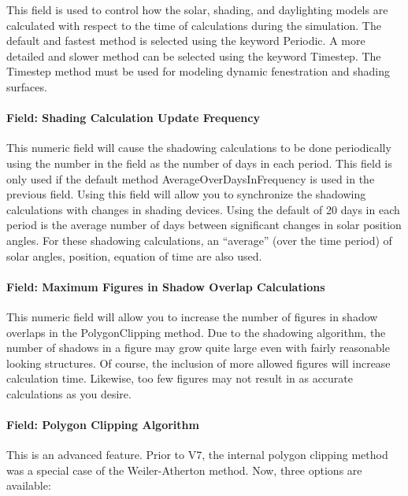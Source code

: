 This field is used to control how the solar, shading, and daylighting models are calculated with respect to the time of calculations during the simulation. The default and fastest method is selected using the keyword Periodic. A more detailed and slower method can be selected using the keyword Timestep. The Timestep method must be used for modeling dynamic fenestration and shading surfaces.

\paragraph{Field: Shading Calculation Update Frequency}\label{field-calculation-frequency}

This numeric field will cause the shadowing calculations to be done periodically using the number in the field as the number of days in each period. This field is only used if the default method AverageOverDaysInFrequency is used in the previous field. Using this field will allow you to synchronize the shadowing calculations with changes in shading devices. Using the default of 20 days in each period is the average number of days between significant changes in solar position angles. For these shadowing calculations, an ``average'' (over the time period) of solar angles, position, equation of time are also used.

\paragraph{Field: Maximum Figures in Shadow Overlap Calculations}\label{field-maximum-figures-in-shadow-overlap-calculations}

This numeric field will allow you to increase the number of figures in shadow overlaps in the PolygonClipping method. Due to the shadowing algorithm, the number of shadows in a figure may grow quite large even with fairly reasonable looking structures. Of course, the inclusion of more allowed figures will increase calculation time. Likewise, too few figures may not result in as accurate calculations as you desire.

\paragraph{Field: Polygon Clipping Algorithm}\label{field-polygon-clipping-algorithm}

This is an advanced feature. Prior to V7, the internal polygon clipping method was a special case of the Weiler-Atherton method. Now, three options are available:

